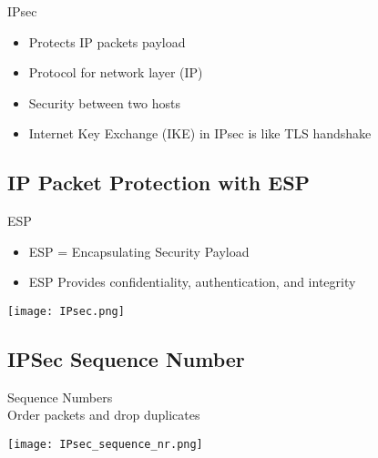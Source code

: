 \begin{definition}{IPsec}\\
    \begin{itemize}
        \item Protects IP packets payload
        \item Protocol for network layer (IP)
        \item Security between two hosts
        \item Internet Key Exchange (IKE) in IPsec is like TLS handshake
    \end{itemize}
\end{definition}

\subsection{IP Packet Protection with ESP}

\begin{concept}{ESP}\\
    \begin{itemize}
        \item ESP = Encapsulating Security Payload
        \item ESP Provides confidentiality, authentication, and integrity
    \end{itemize}
\end{concept}

\texttt{[image: IPsec.png]}

\subsection{IPSec Sequence Number}

\begin{concept}{Sequence Numbers}\\
    Order packets and drop duplicates

    \texttt{[image: IPsec\_sequence\_nr.png]}
\end{concept}